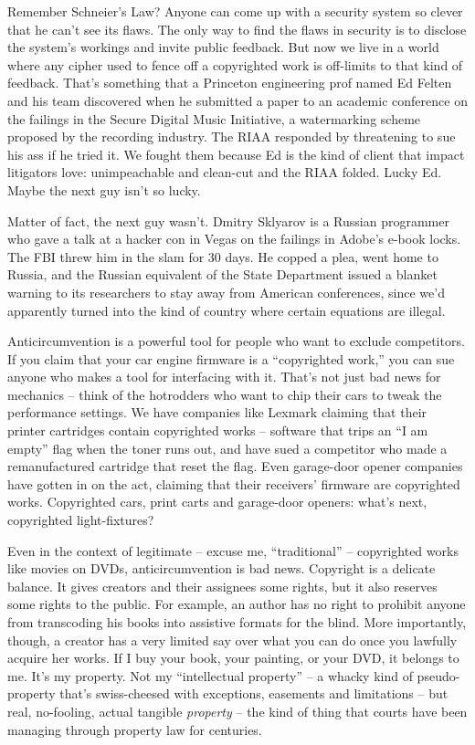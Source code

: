 Remember Schneier's Law? Anyone can come up with a security system
so clever that he can't see its flaws. The only way to find the
flaws in security is to disclose the system's workings and invite
public feedback. But now we live in a world where any cipher used
to fence off a copyrighted work is off-limits to that kind of
feedback. That's something that a Princeton engineering prof named
Ed Felten and his team discovered when he submitted a paper to an
academic conference on the failings in the Secure Digital Music
Initiative, a watermarking scheme proposed by the recording
industry. The RIAA responded by threatening to sue his ass if he
tried it. We fought them because Ed is the kind of client that
impact litigators love: unimpeachable and clean-cut and the RIAA
folded. Lucky Ed. Maybe the next guy isn't so lucky.

Matter of fact, the next guy wasn't. Dmitry Sklyarov is a Russian
programmer who gave a talk at a hacker con in Vegas on the failings
in Adobe's e-book locks. The FBI threw him in the slam for 30 days.
He copped a plea, went home to Russia, and the Russian equivalent
of the State Department issued a blanket warning to its researchers
to stay away from American conferences, since we'd apparently
turned into the kind of country where certain equations are
illegal.

Anticircumvention is a powerful tool for people who want to exclude
competitors. If you claim that your car engine firmware is a
``copyrighted work,'' you can sue anyone who makes a tool for
interfacing with it. That's not just bad news for mechanics --
think of the hotrodders who want to chip their cars to tweak the
performance settings. We have companies like Lexmark claiming that
their printer cartridges contain copyrighted works -- software that
trips an ``I am empty'' flag when the toner runs out, and have sued a
competitor who made a remanufactured cartridge that reset the flag.
Even garage-door opener companies have gotten in on the act,
claiming that their receivers' firmware are copyrighted works.
Copyrighted cars, print carts and garage-door openers: what's next,
copyrighted light-fixtures?

Even in the context of legitimate -- excuse me, ``traditional'' --
copyrighted works like movies on DVDs, anticircumvention is bad
news. Copyright is a delicate balance. It gives creators and their
assignees some rights, but it also reserves some rights to the
public. For example, an author has no right to prohibit anyone from
transcoding his books into assistive formats for the blind. More
importantly, though, a creator has a very limited say over what you
can do once you lawfully acquire her works. If I buy your book,
your painting, or your DVD, it belongs to me. It's my property. Not
my ``intellectual property'' -- a whacky kind of pseudo-property
that's swiss-cheesed with exceptions, easements and limitations --
but real, no-fooling, actual tangible \emph{property} -- the kind
of thing that courts have been managing through property law for
centuries.

